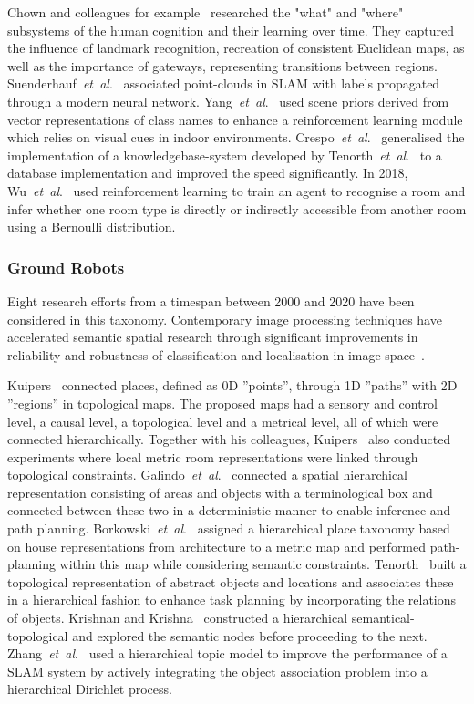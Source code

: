 \documentclass[twocolumn,letterpaper]{IEEEAerospaceCLS}  %
\newcommand{\abbreviation}[1]{\emph{#1}.}
\newcommand{\etal}{\abbreviation{et~al}}
\begin{document}
Chown and colleagues for example~\cite{chown_prototypes_1995} researched the "what" and "where" subsystems of the human cognition and their learning over time. They captured the influence of landmark recognition, recreation of consistent Euclidean maps, as well as the importance of gateways, representing transitions between regions. Suenderhauf~\etal~\cite{sunderhauf_meaningful_2017} associated point-clouds in SLAM with labels propagated through a modern neural network. Yang~\etal~\cite{yang_visual_2018} used scene priors derived from vector representations of class names to enhance a reinforcement learning module which relies on visual cues in indoor environments. Crespo~\etal~\cite{crespo_reasoning_2018} generalised the implementation of a knowledgebase-system developed by Tenorth~\etal~\cite{tenorth_knowrob-map_2010} to a database implementation and improved the speed significantly. In 2018, Wu~\etal~\cite{wu_learning_2018} used reinforcement learning to train an agent to recognise a room and infer whether one room type is directly or indirectly accessible from another room using a Bernoulli distribution.
\subsubsection{Ground Robots} \label{sssec:LitResGro}
Eight research efforts from a timespan between 2000 and 2020 have been considered in this taxonomy. Contemporary image processing techniques have accelerated semantic spatial research through significant improvements in reliability and robustness of classification and localisation in image space~\cite{alom_history_2018}.

Kuipers~\cite{kuipers_spatial_2000} connected places, defined as 0D ''points'', through 1D ''paths'' with 2D ''regions'' in topological maps. The proposed maps had a sensory and control level, a causal level, a topological level and a metrical level, all of which were connected hierarchically. Together with his colleagues, Kuipers~\cite{kuipers_local_2004} also conducted experiments where local metric room representations were linked through topological constraints. Galindo~\etal~\cite{galindo_robot_2008} connected a spatial hierarchical representation consisting of areas and objects with a terminological box and connected between these two in a deterministic manner to enable inference and path planning. Borkowski~\etal~\cite{borkowski_towards_2010} assigned a hierarchical place taxonomy based on house representations from architecture to a metric map and performed path-planning within this map while considering semantic constraints. Tenorth~\cite{tenorth_knowrob-map_2010} built a topological representation of abstract objects and locations and associates these in a hierarchical fashion to enhance task planning by incorporating the relations of objects. Krishnan and Krishna~\cite{krishnan_visual_2010} constructed a hierarchical semantical-topological and explored the semantic nodes before proceeding to the next. Zhang~\etal~\cite{zhang_hierarchical_2019} used a hierarchical topic model to improve the performance of a SLAM system by actively integrating the object association problem into a hierarchical Dirichlet process.
\end{document}
